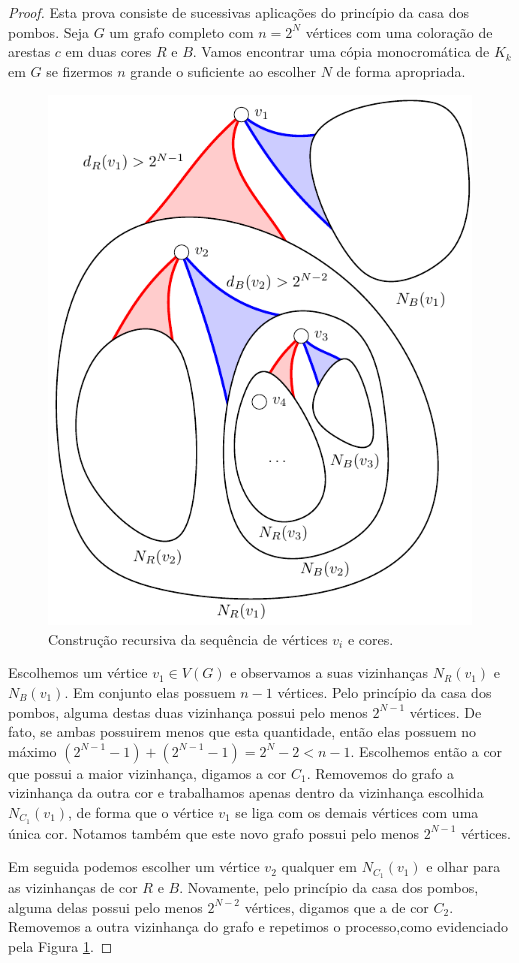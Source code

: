 \begin{proof}
Esta prova consiste de sucessivas aplicações do princípio da casa dos pombos. Seja $G$ um grafo completo com $n = 2^{N}$ vértices com uma coloração de arestas $c$ em duas cores $R$ e $B$. Vamos encontrar uma cópia monocromática de $K_k$ em $G$ se fizermos $n$ grande o suficiente ao escolher $N$ de forma apropriada.

\begin{figure}[h!]
\label{fig:recursive}
\centering
\includegraphics[width=0.7\linewidth]{figures/recursive}
\caption{Construção recursiva da sequência de vértices $v_i$ e cores.}
\end{figure}

Escolhemos um vértice $v_1 \in V(G)$ e observamos a suas vizinhanças $N_R(v_1)$ e $N_B(v_1)$. Em conjunto elas possuem $n-1$ vértices. Pelo princípio da casa dos pombos, alguma destas duas vizinhança possui pelo menos $2^{N-1}$ vértices. De fato, se ambas possuirem menos que esta quantidade, então elas possuem no máximo $(2^{N-1} - 1) + (2^{N-1} - 1)  = 2^N - 2 < n - 1$. Escolhemos então a cor que possui a maior vizinhança, digamos a cor $C_1$. Removemos do grafo a vizinhança da outra cor e trabalhamos apenas dentro da vizinhança escolhida $N_{C_1}(v_1)$, de forma que o vértice $v_1$ se liga com os demais vértices com uma única cor. Notamos também que este novo grafo possui pelo menos $2^{N-1}$ vértices.

Em seguida podemos escolher um vértice $v_2$ qualquer em $N_{C_1}(v_1)$ e olhar para as vizinhanças de cor $R$ e $B$. Novamente, pelo princípio da casa dos pombos, alguma delas possui pelo menos $2^{N-2}$ vértices, digamos que a de cor $C_2$. Removemos a outra vizinhança do grafo e repetimos o processo,como evidenciado pela Figura \ref{fig:recursive}.


\end{proof}
